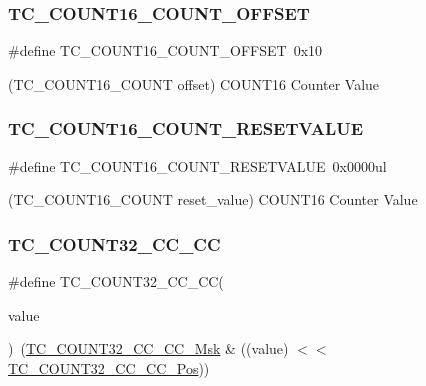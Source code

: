 \subsubsection{\texorpdfstring{TC\_COUNT16\_COUNT\_OFFSET}{TC\_COUNT16\_COUNT\_OFFSET}}
{\footnotesize\ttfamily \#define T\+C\+\_\+\+C\+O\+U\+N\+T16\+\_\+\+C\+O\+U\+N\+T\+\_\+\+O\+F\+F\+S\+ET~0x10}



(T\+C\+\_\+\+C\+O\+U\+N\+T16\+\_\+\+C\+O\+U\+NT offset) C\+O\+U\+N\+T16 Counter Value 

\mbox{\label{group___s_a_m_d21___t_c_ga0b2571b5059abd17998816214179143b}} 
\subsubsection{\texorpdfstring{TC\_COUNT16\_COUNT\_RESETVALUE}{TC\_COUNT16\_COUNT\_RESETVALUE}}
{\footnotesize\ttfamily \#define T\+C\+\_\+\+C\+O\+U\+N\+T16\+\_\+\+C\+O\+U\+N\+T\+\_\+\+R\+E\+S\+E\+T\+V\+A\+L\+UE~0x0000ul}



(T\+C\+\_\+\+C\+O\+U\+N\+T16\+\_\+\+C\+O\+U\+NT reset\+\_\+value) C\+O\+U\+N\+T16 Counter Value 

\mbox{\label{group___s_a_m_d21___t_c_ga7189af9e4ee53d1ac0938f6006df92e8}} 
\subsubsection{\texorpdfstring{TC\_COUNT32\_CC\_CC}{TC\_COUNT32\_CC\_CC}}
{\footnotesize\ttfamily \#define T\+C\+\_\+\+C\+O\+U\+N\+T32\+\_\+\+C\+C\+\_\+\+CC(\begin{DoxyParamCaption}\item[{}]{value }\end{DoxyParamCaption})~(\mbox{\hyperlink{group___s_a_m_d21___t_c_ga535ca783b831120a0c69b0a3041f13bb}{T\+C\+\_\+\+C\+O\+U\+N\+T32\+\_\+\+C\+C\+\_\+\+C\+C\+\_\+\+Msk}} \& ((value) $<$$<$ \mbox{\hyperlink{group___s_a_m_d21___t_c_gae28461f5839eb01e80a6379fe7faf924}{T\+C\+\_\+\+C\+O\+U\+N\+T32\+\_\+\+C\+C\+\_\+\+C\+C\+\_\+\+Pos}}))}

